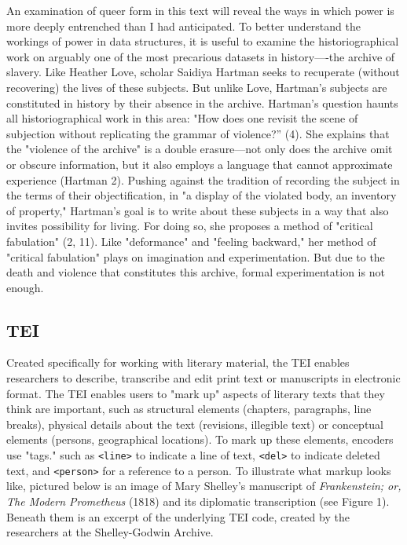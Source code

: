 \documentclass[11pt]{article}
\begin{document}
An examination of queer form in this text will reveal the ways in
which power is more deeply entrenched than I had anticipated. To
better understand the workings of power in data structures, it is
useful to examine the historiographical work on arguably one of the
most precarious datasets in history—-the archive of slavery. Like
Heather Love, scholar Saidiya Hartman seeks to recuperate (without
recovering) the lives of these subjects. But unlike Love, Hartman's
subjects are constituted in history by their absence in the
archive. Hartman's question haunts all historiographical work in this
area: "How does one revisit the scene of subjection without
replicating the grammar of violence?” (4). She explains that the
"violence of the archive" is a double erasure---not only does the
archive omit or obscure information, but it also employs a language
that cannot approximate experience (Hartman 2). Pushing against the
tradition of recording the subject in the terms of their
objectification, in "a display of the violated body, an inventory of
property," Hartman's goal is to write about these subjects in a way
that also invites possibility for living. For doing so, she proposes a
method of "critical fabulation" (2, 11). Like "deformance" and
"feeling backward," her method of "critical fabulation" plays on
imagination and experimentation. But due to the death and violence
that constitutes this archive, formal experimentation is not enough.

\subsection{TEI}
\label{sec:orga313b23}
Created specifically for working with literary material, the TEI
enables researchers to describe, transcribe and edit print text or
manuscripts in electronic format. The TEI enables users to "mark up"
aspects of literary texts that they think are important, such as
structural elements (chapters, paragraphs, line breaks), physical
details about the text (revisions, illegible text) or conceptual
elements (persons, geographical locations). To mark up these elements,
encoders use "tags." such as \texttt{<line>} to indicate a line of text,
\texttt{<del>} to indicate deleted text, and \texttt{<person>} for a reference to a
person. To illustrate what markup looks like, pictured below is an
image of Mary Shelley's manuscript of \emph{Frankenstein; or, The Modern
Prometheus} (1818) and its diplomatic transcription (see Figure
1). Beneath them is an excerpt of the underlying TEI code, created by
the researchers at the Shelley-Godwin Archive.
\end{document}
